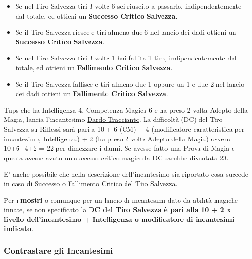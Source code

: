 \begin{multicols}{2}
\begin{itemize}[leftmargin=*]
\item
Se nel Tiro Salvezza tiri 3 volte 6 sei riuscito a passarlo, indipendentemente dal totale, ed ottieni un \textbf{Successo Critico Salvezza}.

\item
Se il Tiro Salvezza riesce e tiri almeno due 6 nel lancio dei dadi ottieni un \textbf{Successo Critico Salvezza}.

\item
Se nel Tiro Salvezza tiri 3 volte 1 hai fallito il tiro, indipendentemente dal totale, ed ottieni un \textbf{Fallimento Critico Salvezza}.

\item
Se il Tiro Salvezza fallisce e tiri almeno due 1 oppure un 1 e due 2 nel lancio dei dadi ottieni un \textbf{Fallimento Critico Salvezza}. 

\end{itemize}

\begin{changemargin}{0.3cm}{0.3cm}\begin{tcolorbox}[title = Tups lancia Dardo Tracciante!]
Tups che ha Intelligenza 4, Competenza Magica 6 e ha preso 2 volta Adepto della Magia, lancia l'incantesimo \hyperlink{Dardo Tracciante}{Dardo Tracciante}. La difficoltà (DC) del Tiro Salvezza su Riflessi sarà pari a 10 + 6 (CM) + 4 (modificatore caratteristica per incantesimo, Intelligenza) + 2 (ha preso 2 volte Adepto della Magia) ovvero 10+6+4+2 = 22 per dimezzare i danni. Se avesse fatto una Prova di Magia e questa avesse avuto un successo critico magico la DC sarebbe diventata 23.
\end{tcolorbox}\end{changemargin}

E' anche possibile che nella descrizione dell'incantesimo sia riportato cosa succede in caso di Successo o Fallimento Critico del Tiro Salvezza.

Per i \textbf{mostri} o comunque per un lancio di incantesimi dato da abilità magiche innate, se non specificato la \textbf{DC del Tiro Salvezza è pari alla 10 + 2 x livello dell'incantesimo + Intelligenza o modificatore di incantesimi indicato}.\label{tirosalvezzainccmostro}

\subsubsection{Contrastare gli Incantesimi}\label{contrastareincantesimi}\hypertarget{contrastareincantesimi}{}


\end{multicols}

